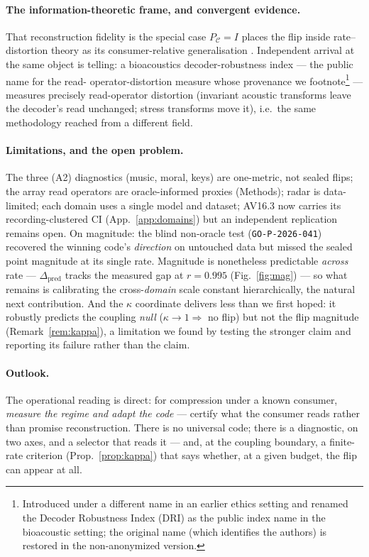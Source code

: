 \documentclass[10pt]{article} %
\theoremstyle{remark}
\newcommand{\PC}{P_{\mathcal{C}}}
\newcommand{\kalign}{\kappa}
\newcommand{\seal}[1]{\texttt{GO-P-2026-#1}}
\begin{document}
\paragraph{The information-theoretic frame, and convergent evidence.} That reconstruction
fidelity is the special case $\PC=I$ places the flip inside rate--distortion theory
\citep{shannon1959,cover2006} as its consumer-relative generalisation \citep{anon-cost}.
Independent arrival at the same object
is telling: a bioacoustics decoder-robustness index --- the public name for the read-
operator-distortion measure whose provenance we footnote\footnote{Introduced under a
different name in an earlier ethics setting and renamed the Decoder Robustness Index (DRI)
as the public index name in the bioacoustic setting; the original name (which identifies the
authors) is restored in the non-anonymized version.} --- measures precisely read-operator distortion
(invariant acoustic transforms leave the decoder's read unchanged; stress transforms move
it), i.e.\ the same methodology reached from a different field.

\paragraph{Limitations, and the open problem.} The three (A2) diagnostics (music, moral,
keys) are one-metric, not sealed flips; the array read operators are oracle-informed proxies
(Methods); radar is data-limited; each domain uses a single model and dataset; AV16.3 now
carries its recording-clustered CI (App.~\ref{app:domains}) but an independent replication
remains open. On magnitude: the blind non-oracle test (\seal{041}) recovered the winning code's
\emph{direction} on untouched data but missed the sealed point magnitude at its single rate.
Magnitude is nonetheless predictable \emph{across} rate --- $\Delta_{\mathrm{pred}}$ tracks
the measured gap at $r=0.995$ (Fig.~\ref{fig:mag}) --- so what remains is calibrating the
cross-\emph{domain} scale constant hierarchically, the natural next contribution. And the $\kalign$ coordinate delivers less
than we first hoped: it robustly predicts the coupling \emph{null} ($\kalign\to1\Rightarrow$
no flip) but not the flip magnitude (Remark~\ref{rem:kappa}), a limitation we found by
testing the stronger claim and reporting its failure rather than the claim.

\paragraph{Outlook.} The operational reading is direct: for compression under a known
consumer, \emph{measure the regime and adapt the code} --- certify what the consumer reads
rather than promise reconstruction. There is no universal code; there is a diagnostic, on
two axes, and a selector that reads it --- and, at the coupling boundary, a finite-rate
criterion (Prop.~\ref{prop:kappa}) that says whether, at a given budget, the flip can appear
at all.
\end{document}
